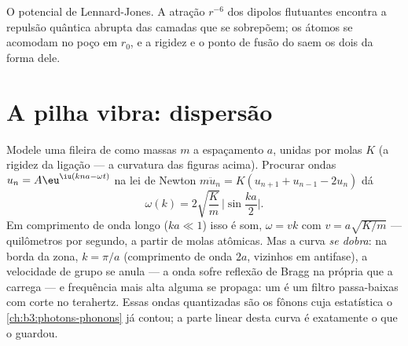 \begin{omfigure}

{\small O potencial de Lennard-Jones. A atração $r^{-6}$ dos
dipolos flutuantes encontra a repulsão quântica abrupta das
camadas que se sobrepõem; os átomos se acomodam no poço em $r_0$, e a
rigidez e o ponto de fusão do  saem os dois da forma dele.}
\end{omfigure}

\section{A pilha vibra: dispersão}

\begin{theorem}\label{thm:b3:crystalline-solids:dispersion}
Modele uma fileira de  como massas $m$ a espaçamento $a$, unidas
por molas $K$ (a rigidez da ligação --- a curvatura das figuras acima).
Procurar ondas $u_n = A\eu^{\iu(kna - \omega t)}$ na lei de Newton
$m\ddot u_n = K(u_{n+1} + u_{n-1} - 2u_n)$ dá
\[
\omega(k) = 2\sqrt{\frac{K}{m}}\,\Big|\sin\frac{ka}{2}\Big| .
\]
Em comprimento de onda longo ($ka \ll 1$) isso é som, $\omega = vk$ com
$v = a\sqrt{K/m}$ --- quilômetros por segundo, a partir de molas
atômicas. Mas a curva \emph{se dobra}: na borda da zona, $k = \pi/a$
(comprimento de onda $2a$, vizinhos em antifase), a velocidade de grupo
se anula --- a onda sofre reflexão de Bragg na própria  que a
carrega --- e frequência mais alta alguma se propaga: um  é um
filtro passa-baixas com corte no terahertz. Essas ondas quantizadas são
os fônons cuja estatística o \cref{ch:b3:photons-phonons} já
contou; a parte linear desta curva é exatamente o que o 
guardou.
\end{theorem}

